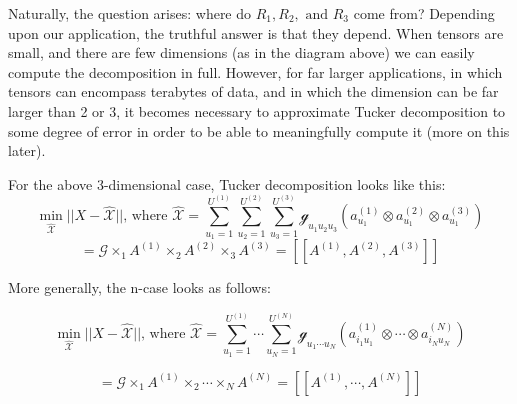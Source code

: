 \documentclass[11pt]{article}
\newcommand\0{\mathbf{0}}
\newcommand\<{\langle}
\renewcommand\>{\rangle}
\begin{document}
Naturally, the question arises: where do $R_1, R_2, \text{ and } R_3$ come from? Depending upon our application, the truthful answer is that they depend. When tensors are small, and there are few dimensions (as in the diagram above) we can easily compute the decomposition in full. However, for far larger applications, in which tensors can encompass terabytes of data, and in which the dimension can be far larger than 2 or 3, it becomes necessary to approximate Tucker decomposition to some degree of error in order to be able to meaningfully compute it (more on this later).

For the above 3-dimensional case, Tucker decomposition looks like this:
$$\min_{\hat{\mathcal{X}}}||X-\hat{\mathcal{X}}||\text{, where } \hat{\mathcal{X}}=\sum_{u_1=1}^{U^{(1)}}\sum_{u_2=1}^{U^{(2)}}\sum_{u_3=1}^{U^{(3)}}\mathcal{g}_{u_1 u_2 u_3}(a^{(1)}_{u_1} \otimes a^{(2)}_{u_1}\otimes a^{(3)}_{u_1})$$
$$=\mathcal{G}\times_1 A^{(1)}\times_2 A^{(2)}\times_3 A^{(3)}=[[A^{(1)},A^{(2)},A^{(3)}]]$$

More generally, the n-case looks as follows:

$$\min_{\hat{\mathcal{X}}}||X-\hat{\mathcal{X}}||\text{, where } \hat{\mathcal{X}}=\sum_{u_1=1}^{U^{(1)}}\cdots\sum_{u_N=1}^{U^{(N)}}\mathcal{g}_{u_1 \cdots u_N}(a^{(1)}_{i_1 u_1} \otimes \cdots\otimes a^{(N)}_{i_N u_N})$$

$$=\mathcal{G}\times_1 A^{(1)}\times_2 \cdots\times_N A^{(N)}=[[A^{(1)},\cdots,A^{(N)}]]$$

\end{document}
